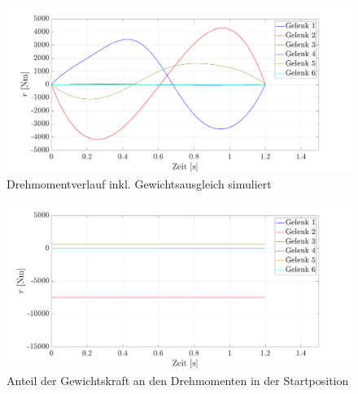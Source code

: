 \begin{figure}[tbph]
	\centering
	\includegraphics[width=1\linewidth]{images/taumat-fg}
	\caption{Drehmomentverlauf inkl. Gewichtsausgleich simuliert}
	\label{fig:taumat-fg}
\end{figure}
%
\begin{figure}[tbph]
	\centering
	\includegraphics[width=1\linewidth]{images/Gewichtskraft}
	\caption{Anteil der Gewichtskraft an den Drehmomenten in der Startposition}
	\label{fig:gewichtskraft}
\end{figure}
%








